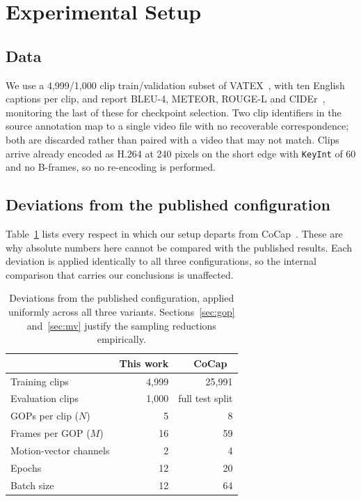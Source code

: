\documentclass[10pt,twocolumn,letterpaper]{article}
\begin{document}
\section{Experimental Setup}
\label{sec:setup}

\subsection{Data}

We use a 4,999/1,000 clip train/validation subset of VATEX~\cite{vatex}, with ten English
captions per clip, and report BLEU-4, METEOR, ROUGE-L and CIDEr~\cite{cider}, monitoring the last
of these for checkpoint selection. Two clip identifiers in the source annotation map to a single video file with
no recoverable correspondence; both are discarded rather than paired with a video that may not
match. Clips arrive already encoded as H.264 at 240 pixels on the short edge with
\texttt{KeyInt} of 60 and no B-frames, so no re-encoding is performed.

\subsection{Deviations from the published configuration}
\label{sec:deviations}

Table~\ref{tab:deviations} lists every respect in which our setup departs from
CoCap~\cite{cocap}. These are why absolute numbers here cannot be compared with the published
results. Each deviation is applied identically to all three configurations, so the internal
comparison that carries our conclusions is unaffected.

\begin{table}[t]
\centering\small
\begin{tabular}{lrr}
\toprule
 & This work & CoCap~\cite{cocap} \\
\midrule
Training clips             & 4{,}999 & 25{,}991 \\
Evaluation clips           & 1{,}000 & full test split \\
GOPs per clip ($N$)        & 5 & 8 \\
Frames per GOP ($M$)       & 16 & 59 \\
Motion-vector channels     & 2 & 4 \\
Epochs                     & 12 & 20 \\
Batch size                 & 12 & 64 \\
\bottomrule
\end{tabular}
\caption{Deviations from the published configuration, applied uniformly across all three
variants. Sections~\ref{sec:gop} and~\ref{sec:mv} justify the sampling reductions empirically.}
\label{tab:deviations}
\end{table}
\end{document}
